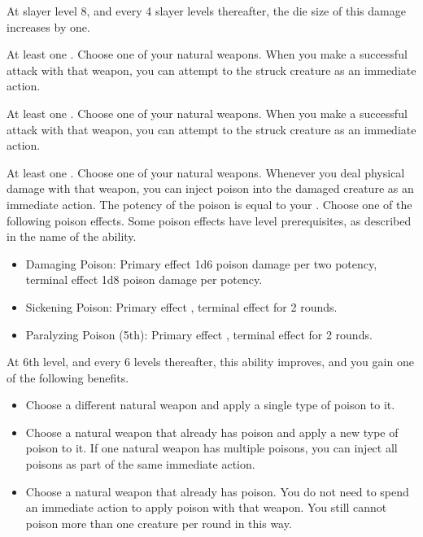     At slayer level 8, and every 4 slayer levels thereafter, the die size of this damage increases by one.

    \featpre At least one .
    \featben Choose one of your natural weapons.
    When you make a successful attack with that weapon, you can attempt to  the struck creature as an immediate action.

    \featpre At least one .
    \featben Choose one of your natural weapons.
    When you make a successful attack with that weapon, you can attempt to  the struck creature as an immediate action.

    \featpre At least one .
    \featben Choose one of your natural weapons.
    Whenever you deal physical damage with that weapon, you can inject poison into the damaged creature as an immediate action.
    The potency of the poison is equal to your .
    Choose one of the following poison effects.
    Some poison effects have level prerequisites, as described in the name of the ability.
    \begin{itemize}
        \item Damaging Poison: Primary effect 1d6 poison damage per two potency, terminal effect 1d8 poison damage per potency.
        \item Sickening Poison: Primary effect \sickened, terminal effect \nauseated for 2 rounds.
        \item Paralyzing Poison (5th): Primary effect \immobilized, terminal effect \paralyzed for 2 rounds.
    \end{itemize}

    At 6th level, and every 6 levels thereafter, this ability improves, and you gain one of the following benefits.
    \begin{itemize}
        \item Choose a different natural weapon and apply a single type of poison to it.
        \item Choose a natural weapon that already has poison and apply a new type of poison to it.
            If one natural weapon has multiple poisons, you can inject all poisons as part of the same immediate action.
        \item Choose a natural weapon that already has poison.
            You do not need to spend an immediate action to apply poison with that weapon.
            You still cannot poison more than one creature per round in this way.
    \end{itemize}

